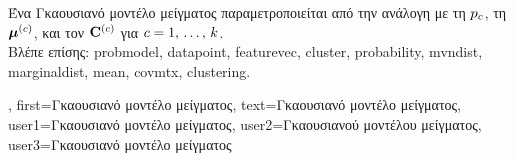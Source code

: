 {{\begin{figure}[H]
\begin{center}
		\end{center}
		\end{figure}
		\foreignlanguage{greek}{Ένα Γκαουσιανό μοντέλο μείγματος παραμετροποιείται από την ανάλογη με τη}  
		 $p_{c}$, \foreignlanguage{greek}{τη}  ${\bm \mu}^{(c)}$, 
		\foreignlanguage{greek}{και τον}  $\mathbf{C}^{(c)}$ \foreignlanguage{greek}{για} $c=1,\,\ldots,\,k$.
		\\
		\foreignlanguage{greek}{Βλέπε επίσης:} \gls{probmodel}, \gls{datapoint}, \gls{featurevec}, \gls{cluster}, \gls{probability}, 
		\gls{mvndist}, \gls{marginaldist}, \gls{mean}, \gls{covmtx}, \gls{clustering}. },
	first={\foreignlanguage{greek}{Γκαουσιανό μοντέλο μείγματος}},
	text={\foreignlanguage{greek}{Γκαουσιανό μοντέλο μείγματος}},
	user1={\foreignlanguage{greek}{Γκαουσιανό μοντέλο μείγματος}}, %
  	user2={\foreignlanguage{greek}{Γκαουσιανού μοντέλου μείγματος}}, %
	user3={\foreignlanguage{greek}{Γκαουσιανό μοντέλο μείγματος}} %
}%


